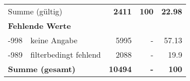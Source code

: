 \begin{longtable}{lXrrr}
     \midrule
     \multicolumn{2}{l}{Summe (gültig)} &
       \textbf{\num{2411}} &
     \textbf{100} &
       \textbf{\num[round-mode=places,round-precision=2]{22,98}} \\
     \multicolumn{5}{l}{\textbf{Fehlende Werte}}\\
       -998 &
       keine Angabe &
         \num{5995} &
        - &
         \num[round-mode=places,round-precision=2]{57,13} \\
       -989 &
       filterbedingt fehlend &
         \num{2088} &
        - &
         \num[round-mode=places,round-precision=2]{19,9} \\
     \midrule
     \multicolumn{2}{l}{\textbf{Summe (gesamt)}} &
          \textbf{\num{10494}} &
        \textbf{-} &
        \textbf{100} \\
     \bottomrule
     \end{longtable}
     
